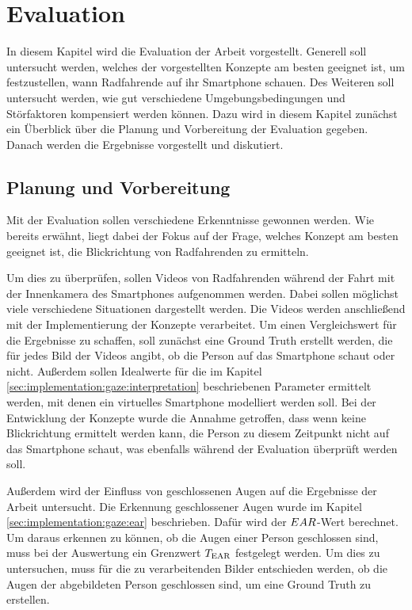 \chapter{Evaluation}\label{sec:evaluation}

In diesem Kapitel wird die Evaluation der Arbeit vorgestellt. Generell soll untersucht werden, welches der vorgestellten Konzepte am besten geeignet ist, um festzustellen, wann Radfahrende auf ihr Smartphone schauen. Des Weiteren soll untersucht werden, wie gut verschiedene Umgebungsbedingungen und Störfaktoren kompensiert werden können. Dazu wird in diesem Kapitel zunächst ein Überblick über die Planung und Vorbereitung der Evaluation gegeben. Danach werden die Ergebnisse vorgestellt und diskutiert.

\section{Planung und Vorbereitung}

Mit der Evaluation sollen verschiedene Erkenntnisse gewonnen werden. Wie bereits erwähnt, liegt dabei der Fokus auf der Frage, welches Konzept am besten geeignet ist, die Blickrichtung von Radfahrenden zu ermitteln.

Um dies zu überprüfen, sollen Videos von Radfahrenden während der Fahrt mit der Innenkamera des Smartphones aufgenommen werden. Dabei sollen möglichst viele verschiedene Situationen dargestellt werden. Die Videos werden anschließend mit der Implementierung der Konzepte verarbeitet. Um einen Vergleichswert für die Ergebnisse zu schaffen, soll zunächst eine Ground Truth erstellt werden, die für jedes Bild der Videos angibt, ob die Person auf das Smartphone schaut oder nicht. Außerdem sollen Idealwerte für die im Kapitel \ref{sec:implementation:gaze:interpretation} beschriebenen Parameter ermittelt werden, mit denen ein virtuelles Smartphone modelliert werden soll. Bei der Entwicklung der Konzepte wurde die Annahme getroffen, dass wenn keine Blickrichtung ermittelt werden kann, die Person zu diesem Zeitpunkt nicht auf das Smartphone schaut, was ebenfalls während der Evaluation überprüft werden soll. 

Außerdem wird der Einfluss von geschlossenen Augen auf die Ergebnisse der Arbeit untersucht. Die Erkennung geschlossener Augen wurde im Kapitel \ref{sec:implementation:gaze:ear} beschrieben. Dafür wird der $EAR$-Wert berechnet. Um daraus erkennen zu können, ob die Augen einer Person geschlossen sind, muss bei der Auswertung ein Grenzwert $T_{\text{EAR}}$ festgelegt werden. Um dies zu untersuchen, muss für die zu verarbeitenden Bilder entschieden werden, ob die Augen der abgebildeten Person geschlossen sind, um eine Ground Truth zu erstellen.

